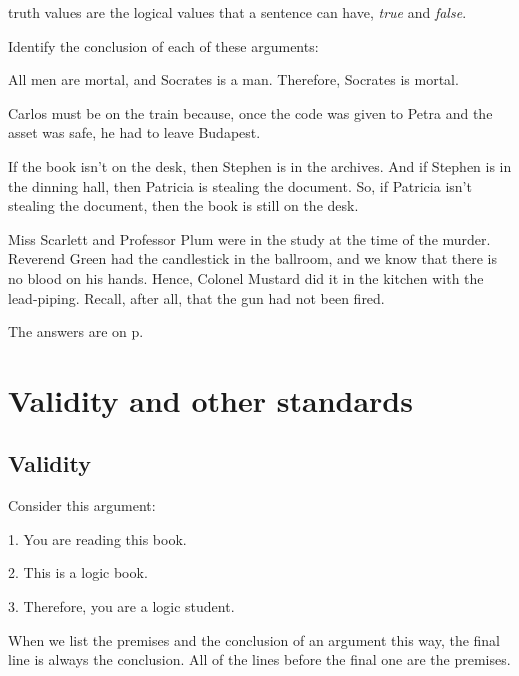 \begin{factboxy}{truth values}
 are the logical values that a sentence can have, \textit{true} and \textit{false}.
\end{factboxy}

\practiceproblems

\noindent Identify the conclusion of each of these arguments:
\begin{earg}
	\item All men are mortal, and Socrates is a man. Therefore, Socrates is mortal.
	\item Carlos must be on the train because, once the code was given to Petra and the asset was safe, he had to leave Budapest.
	\item If the book isn't on the desk, then Stephen is in the archives. And if Stephen is in the dinning hall, then Patricia is stealing the document. So, if Patricia isn't stealing the document, then the book is still on the desk.
	\item Miss Scarlett and Professor Plum were in the study at the time of the murder. Reverend Green had the candlestick in the ballroom, and we know that there is no blood on his hands. Hence, Colonel Mustard did it in the kitchen with the lead-piping. Recall, after all, that the gun had not been fired.
\end{earg}

The answers are on p.~\pageref{ch1-answers}




\chapter{Validity and other standards}\label{s:Valid}

\section{Validity}\label{s:Valid-def}

Consider this argument:
	\begin{earg}
		\item[1.] You are reading this book.
		\item[2.] This is a logic book.
		\item[3.] Therefore, you are a logic student.
	\end{earg}

\begin{notebox}
When we list the premises and the conclusion of an argument this way, the final line is always the conclusion. All of the lines before the final one are the premises.
\end{notebox}

